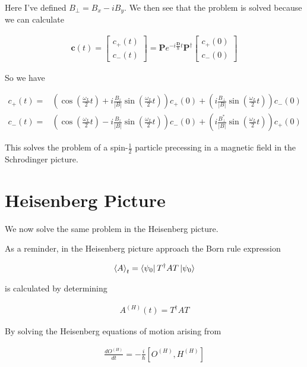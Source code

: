 \documentclass[12pt]{article}
\newcommand{\bv}[1]{\boldsymbol{#1}}
\begin{document}
Here I've defined $B_{\perp} = B_x - i B_y$.
We then see that the problem is solved because we can calculate

\begin{align}
\bv{c}(t) = \begin{bmatrix}c_+(t)\\c_-(t)\end{bmatrix} = 
\bv{P}e^{-i\frac{\bv{D}}{\hbar} t}\bv{P}^{\dag}\begin{bmatrix}c_+(0)\\c_-(0)\end{bmatrix}
\end{align}

So we have

\begin{align}
c_+(t) = & \left(\cos\left(\frac{\omega_L}{2} t\right) + i\frac{B_z}{|B|}\sin\left(\frac{\omega_L}{2}t\right)\right)c_+(0) + \left(i\frac{B_{\perp}}{|B|}\sin\left(\frac{\omega_L}{2} t\right)\right)c_-(0) \nonumber\\
c_-(t) = & \left(\cos\left(\frac{\omega_L}{2} t\right) - i\frac{B_z}{|B|}\sin\left(\frac{\omega_L}{2}t\right)\right)c_-(0) + \left(i\frac{B_{\perp}^*}{|B|}\sin\left(\frac{\omega_L}{2} t\right)\right)c_+(0)
\end{align}

This solves the problem of a spin-$\frac{1}{2}$ particle precessing in a magnetic field in the Schrodinger picture.

\section{Heisenberg Picture}

We now solve the same problem in the Heisenberg picture.

As a reminder, in the Heisenberg picture approach the Born rule expression

\begin{align}
\braket{A}_t = \bra{\psi_0}T^{\dag}AT\ket{\psi_0}
\end{align}

is calculated by determining 

\begin{align}
A^{(H)}(t) = T^{\dag}AT
\end{align}

By solving the Heisenberg equations of motion arising from

\begin{align}
\frac{dO^{(H)}}{dt} = -\frac{i}{\hbar}\left[O^{(H)}, H^{(H)}\right]
\end{align}
\end{document}
